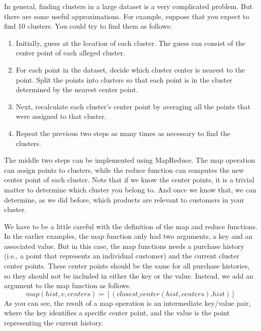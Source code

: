 In general, finding clusters in a large dataset is a very complicated problem.
But there are some useful approximations.  For example, suppose that you expect
to find 10 clusters.  You could try to find them as follows:
\begin{enumerate}
	\item Initially, guess at the location of each cluster.  The guess can consist
		of the center point of each alleged cluster.
	\item For each point in the dataset, decide which cluster center is nearest
		to the point.  Split the points into clusters so that each point is
		in the cluster determined by the nearest center point.
	\item Next, recalculate each cluster's center point by averaging all the
		points that were assigned to that cluster.
	\item Repeat the previous two steps as many times as necessary to find the
		clusters.
\end{enumerate}
The middle two steps can be implemented using MapReduce.  The map operation can
assign points to clusters, while the reduce function can computes the new center
point of each cluster.  Note that if we know the center points, it is a trivial
matter to determine which cluster you belong to.  And once we know that, we can
determine, as we did before, which products are relevant to customers in your
cluster.

We have to be a little careful with the definition of the map and reduce functions.
In the earlier examples, the map function only had two arguments, a key and an
associated value.  But in this case, the map functions needs a purchase history (i.e.,
a point that represents an individual customer) and the current cluster center
points.  These center points should be the same for all purchase histories, so
they should not be included in either the key or the value.  Instead, we add an
argument to the map function as follows.
\begin{displaymath}
map(hist, v, centers) = [ ( closest\_center(hist, centers) . hist ) ]
\end{displaymath}
As you can see, the result of a map operation is an intermediate key/value pair, where the key
identifies a specific center point, and the value is the point representing the
current history.

